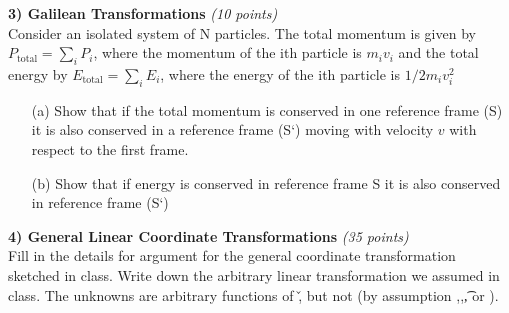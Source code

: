 {%

\textbf{3) Galilean Transformations } \hfill \textit{(10 points)}\\

Consider an isolated system of N particles. The total momentum is given by $P_{\textrm{total}} = \sum_i P_i$, where the momentum of the ith particle is $m_i v_i$ and the total energy by $E_{\textrm{total}} = \sum_i E_i$, where the energy of the ith particle is $1/2 m_i v_i^2$
\begin{itemize}
\item[(a)]Show that if the total momentum is conserved in one reference frame (S) it is also conserved in a reference frame (S`) moving with velocity $v$ with respect to the first frame.
\item[(b)]Show that if energy is conserved in reference frame S it is also conserved in reference frame (S`)
\end{itemize}
}

\vspace*{0.25in}

\textbf{4) General Linear Coordinate Transformations } \hfill \textit{(35 points)}\\

Fill in the details for argument for the general coordinate transformation sketched in class.
Write down the arbitrary linear transformation we assumed in class.
The unknowns are arbitrary functions of \v, but not (by assumption \x,\xp,\t, or \tp).

